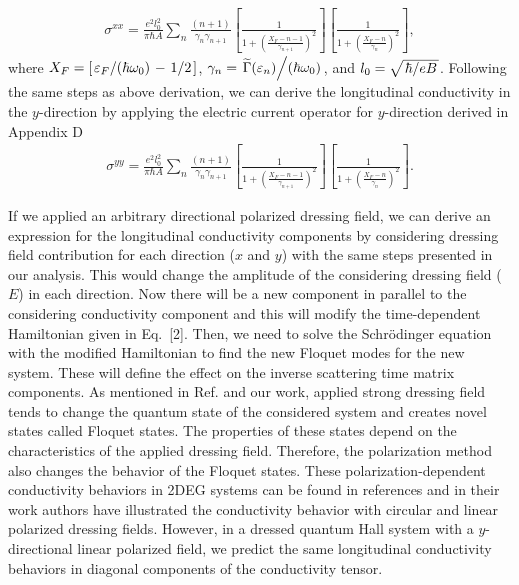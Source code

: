 \documentclass{article}
\begin{document}
\begin{itemize}
{\begin{equation}
    \begin{aligned}
      \sigma^{xx}  =
      \frac{e^2l_0^2}{\pi\hbar A}
      \sum_{n}
      \frac{(n+1)}{\gamma_{n}\gamma_{n+1}}
      \left[
        \frac{1}
        {
          1 + \left(\frac{X_F - n -1}{\gamma_{n+1}}\right)^2
        }
      \right]
      \left[
        \frac{1}
        {
          1 + \left(\frac{X_F - n}{\gamma_{n}}\right)^2
        }
      \right],
    \end{aligned}
  \end{equation}
  where $X_F = \left[\flatfrac{\varepsilon_F}{(\hbar \omega_0)} - \flatfrac{1}{2}\right]$,
  $\gamma_n = \flatfrac{\widetilde{{\Gamma}}(\varepsilon_n)}{(\hbar \omega_0)}$, and $l_0 = \sqrt{\flatfrac{\hbar}{eB}}$.
  Following the same steps as above derivation, we can derive the longitudinal conductivity in the $y$-direction by applying the electric current operator for $y$-direction derived in Appendix D
  \begin{equation} \tag{36}
    \begin{aligned}
      {\sigma}^{yy} =
      \frac{e^2l_0^2}{\pi\hbar A}
      \sum_{n}
      \frac{(n+1)}{\gamma_{n}\gamma_{n+1}}
      \left[
        \frac{1}
        {
          1 + \left(\frac{X_F - n -1}{\gamma_{n+1}}\right)^2
        }
      \right]
      \left[
        \frac{1}
        {
          1 + \left(\frac{X_F - n}{\gamma_{n}}\right)^2
        }
      \right].
    \end{aligned}
  \end{equation}
  }
\end{itemize}

If we applied an arbitrary directional polarized dressing field, we can derive an expression for the longitudinal conductivity components by considering dressing field contribution for each direction ($x$ and $y$) with the same steps presented in our analysis. This would change the amplitude of the considering dressing field ($E$) in each direction. Now there will be a new component in parallel to the considering conductivity component and this will modify the time-dependent Hamiltonian given in Eq.~[2]. Then, we need to solve the Schrödinger equation with the modified Hamiltonian to find the new Floquet modes for the new system. These will define the effect on the inverse scattering time matrix components. As mentioned in Ref. \cite{wackerl20} and our work, applied strong dressing field tends to change the quantum state of the considered system and creates novel states called Floquet states. The properties of these states depend on the characteristics of the applied dressing field. Therefore, the polarization method also changes the behavior of the Floquet states. These polarization-dependent conductivity behaviors in 2DEG systems can be found in references \cite{wackerl20,morina15} and in their work authors have illustrated the conductivity behavior with circular and linear polarized dressing fields. However, in a dressed quantum Hall system with a $y$-directional linear polarized field, we predict the same longitudinal conductivity behaviors in diagonal components of the conductivity tensor.
\end{document}
